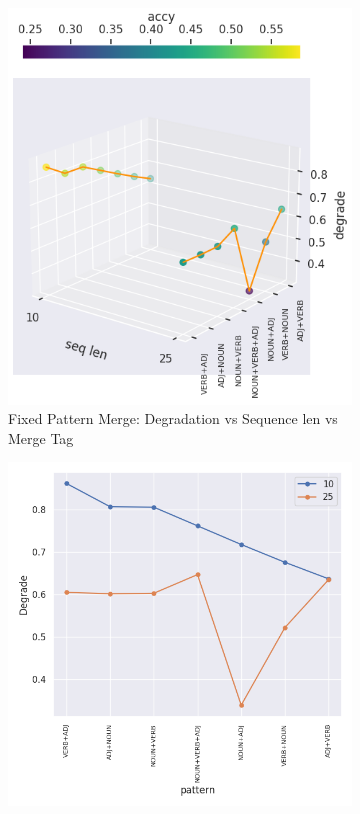 \documentclass[12pt]{article}
\begin{document}
\begin{figure} [!h]
\begin{center}
\begin{subfigure}[h]{0.4\linewidth} 
\includegraphics[width=\linewidth]{figures/tokenmerge_fixpattern1.png}
\caption{Fixed Pattern Merge: Degradation vs Sequence len vs Merge Tag}
\label{fig:fixmergeScatter1}
\end{subfigure}
\hfill
\begin{subfigure}[h]{0.4\linewidth} 
\includegraphics[width=\linewidth]{figures/tokenmerge_fixpattern2.png}

\end{subfigure}
\end{center}
\end{figure}
\end{document}
